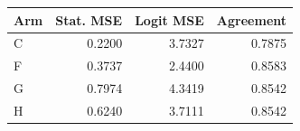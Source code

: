 \begin{tabular}{lrrr}
\toprule
Arm & Stat. MSE & Logit MSE & Agreement \\
\midrule
C & 0.2200 & 3.7327 & 0.7875 \\
F & 0.3737 & 2.4400 & 0.8583 \\
G & 0.7974 & 4.3419 & 0.8542 \\
H & 0.6240 & 3.7111 & 0.8542 \\
\bottomrule
\end{tabular}
